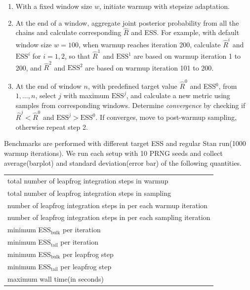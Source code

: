 \documentclass[landscape,a0paper,fontscale=0.45]{baposter} %
\begin{document}
\begin{poster}
{\begin{multicols}{2}
\begin{enumerate}
\item With a fixed window size \(w\), initiate warmup with stepsize adaptation.
\item At the end of a window, aggregate joint posterior probability from all the chains and calculate corresponding \(\hat{R}\) and ESS. 
For example, with default window size \(w=100\), when warmup reaches iteration 200, calculate
\(\hat{R}^i\) and \(\text{ESS}^i\) for \(i=1, 2\), so that
\(\hat{R}^1\) and \(\text{ESS}^1\) are based on warmup iteration 1 to
200, and \(\hat{R}^2\) and \(\text{ESS}^2\) are based on warmup iteration 101 to 200.
\item At the end of window \(n\), with predefined target value
  \(\hat{R}^{0}\) and ESS\(^{0}\), from \({1, \dots, n}\), select \(j\) with maximum $\text{ESS}^j$,
and calculate a new metric using samples from corresponding
windows. Determine \emph{convergence} by checking if $\hat{R}^j < \hat{R}^0$ and $\text{ESS}^j > \text{ESS}^0$. 
If converges, move to post-warmup sampling, otherwise repeat step 2.
\end{enumerate}


\vspace{1em}
Benchmarks are performed with different target ESS and
regular Stan run(1000 warmup iterations).
We run each setup with 10 PRNG seeds and collect average(barplot) and
standard deviation(error bar) of the following quantities.
\begin{center}
\footnotesize
\begin{tabular}{l}
\hline
total number of leapfrog integration steps in warmup \\
total number of leapfrog integration steps in sampling \\
number of leapfrog integration steps in per each warmup iteration \\
number of leapfrog integration steps in per each sampling iteration \\
minimum ESS\(_{\text{bulk}}\) per iteration \\
minimum ESS\(_{\text{tail}}\) per iteration \\
minimum ESS\(_{\text{bulk}}\) per leapfrog step \\
minimum ESS\(_{\text{tail}}\) per leapfrog step \\
maximum wall time(in seconds) \\
\hline
\end{tabular}
\end{center}


\end{multicols}}
\end{poster}
\end{document}
